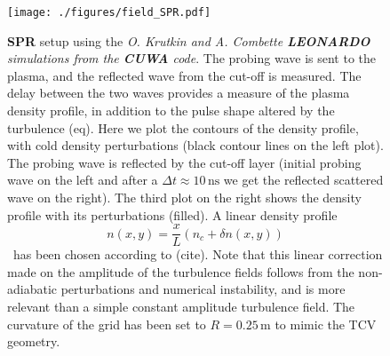 \documentclass[11pt,openany]{report}
\begin{document}
\begin{figure}[H]
    \centering
    \hspace*{-.17cm}\texttt{[image: ./figures/field\_SPR.pdf]}
    \caption{\textbf{SPR} setup using the \emph{O. Krutkin and A. Combette \textbf{LEONARDO} simulations from the \textbf{CUWA} code}. The probing wave is sent to the plasma, and the reflected wave from the cut-off is measured. The delay between the two waves provides a measure of the plasma density profile, in addition to the pulse shape altered by the turbulence (eq). Here we plot the contours of the density profile, with cold density perturbations (black contour lines on the left plot). The probing wave is reflected by the cut-off layer (initial probing wave on the left and after a $\Delta t \approx 10 \, \text{ns}$ we get the reflected scattered wave on the right). The third plot on the right shows the density profile with its perturbations (filled). A linear density profile
        \[ n(x,y) = \frac{x}{L} \left(n_c + \delta n(x,y)\right) \]\
        has been chosen according to (cite). Note that this linear correction made on the amplitude of the turbulence fields follows from the non-adiabatic perturbations \cite{San_diego} and numerical instability, and is more relevant than a simple constant amplitude turbulence field. The curvature of the grid has been set to \( R = 0.25 \, \text{m} \) to mimic the TCV geometry.}
    \label{}
\end{figure}
\end{document}
